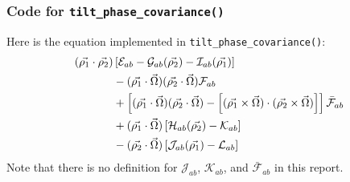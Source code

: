 \subsubsection{Code for \texttt{tilt\_phase\_covariance()}}
Here is the equation implemented in \texttt{tilt\_phase\_covariance()}:
\begin{equation}
\begin{split}
(\vec{\rho_1} \cdot \vec{\rho_2}) & \left[ \mathcal{E}_{ab} - \mathcal{G}_{ab}(\vec{\rho_2}) -
\mathcal{I}_{ab}(\vec{\rho_1}) \right] \\
& - (\vec{\rho_1} \cdot \vec{\Omega}) (\vec{\rho_2} \cdot \vec{\Omega}) \mathcal{F}_{ab} \\
& + \left[ (\vec{\rho_1} \cdot \vec{\Omega}) (\vec{\rho_2} \cdot \vec{\Omega}) - 
\left[ (\vec{\rho_1} \times \vec{\Omega}) \cdot (\vec{\rho_2} \times \vec{\Omega}) \right] \right]
\bar{\mathcal{F}}_{ab} 
\\
& + (\vec{\rho_1} \cdot \vec{\Omega}) \left[ \mathcal{H}_{ab}(\vec{\rho_2}) - \mathcal{K}_{ab} \right] \\
& - (\vec{\rho_2} \cdot \vec{\Omega}) \left[ \mathcal{J}_{ab}(\vec{\rho_1}) - \mathcal{L}_{ab} \right] \\
\end{split}
\end{equation}
Note that there is no definition for $\mathcal{J}_{ab}$, $\mathcal{K}_{ab}$, and 
$\bar{\mathcal{F}}_{ab}$ in this report.
